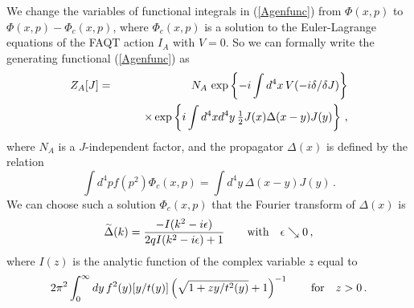 \documentclass[a4paper,12pt]{article}
\newcommand{\half}{{\textstyle{1\over2}}}
\newcommand{\Polje}{\Phi}
\newcommand{\Lagi}{V}
\newcommand{\prop}{\widetilde{\Delta}}
\begin{document}
We change the variables of functional integrals in (\ref{Agenfunc}) from $\Polje(x,p)$ to $\Polje(x,p) - \Polje_c(x,p)$, where $\Polje_c(x,p)$ is a solution to the Euler-Lagrange equations of the FAQT action $I_A$ with $\Lagi = 0$. So we can  formally write the generating functional (\ref{Agenfunc}) as
\begin{eqnarray}
   Z_A[J] &=& N_A \, \exp \left \{ -i \int d^4x \, \Lagi( -i \delta/ \delta J ) \right \} \nonumber\\
        & & \qquad\times  \exp \left \{ i \int d^4x d^4y \, \half J(x) \Delta(x-y) J(y) \right \}  \,,
   \label{Agenfunctrans}
\end{eqnarray}
where $N_A$ is a $J$-independent factor, and the propagator $\Delta(x)$ is defined by the relation
\begin{equation}
   \int d^4p f(p^2) \Polje_c(x,p) = \int d^4y \, \Delta(x-y) J(y) \,.
   \label{tranpropdef}
\end{equation}
We can choose \cite{mi002} such a solution $\Polje_c(x,p)$ that the Fourier transform of $\Delta(x)$ is
\begin{equation}
   \prop(k) = { - I(k^2 - i\epsilon) \over 2q I(k^2 - i\epsilon) + 1 } \qquad \hbox{with}\quad \epsilon \searrow 0  \,,
   \label{tranprop}
\end{equation}
where $I(z)$ is the analytic function of the complex variable $z$ equal to
\begin{equation}
   2\pi^2 \int_0^\infty dy\, f^2(y) [ y/ t(y) ] \left( \sqrt{1 + z y/ t^2(y)} + 1 \right) ^{-1} \qquad\hbox{for}\quad z > 0 \,.
   \label{imnr}
\end{equation}
\end{document}

